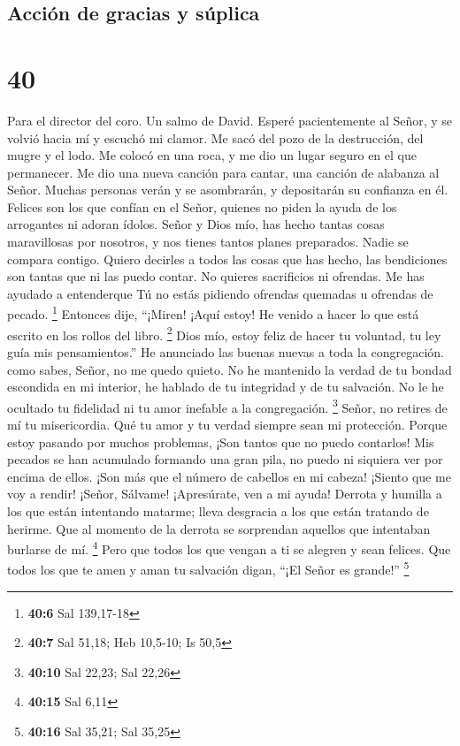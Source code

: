 \hypertarget{acciuxf3n-de-gracias-y-suxfaplica}{%
\subsection{Acción de gracias y
súplica}\label{acciuxf3n-de-gracias-y-suxfaplica}}

\hypertarget{section-39}{%
\section{40}\label{section-39}}

Para el director del coro. Un salmo de David.  Esperé
pacientemente al Señor, y se volvió hacia mí y escuchó mi clamor.
 Me sacó del pozo de la destrucción, del mugre y el lodo. Me
colocó en una roca, y me dio un lugar seguro en el que permanecer.
 Me dio una nueva canción para cantar, una canción de
alabanza al Señor. Muchas personas verán y se asombrarán, y depositarán
su confianza en él.  Felices son los que confían en el
Señor, quienes no piden la ayuda de los arrogantes ni adoran ídolos.
 Señor y Dios mío, has hecho tantas cosas maravillosas por
nosotros, y nos tienes tantos planes preparados. Nadie se compara
contigo. Quiero decirles a todos las cosas que has hecho, las
bendiciones son tantas que ni las puedo contar.  No quieres
sacrificios ni ofrendas. Me has ayudado a entenderque Tú no estás
pidiendo ofrendas quemadas u ofrendas de pecado. \footnote{\textbf{40:6}
  Sal 139,17-18}  Entonces dije, ``¡Miren! ¡Aquí estoy! He
venido a hacer lo que está escrito en los rollos del libro. \footnote{\textbf{40:7}
  Sal 51,18; Heb 10,5-10; Is 50,5}  Dios mío, estoy feliz de
hacer tu voluntad, tu ley guía mis pensamientos.''  He
anunciado las buenas nuevas a toda la congregación. como sabes, Señor,
no me quedo quieto.  No he mantenido la verdad de tu bondad
escondida en mi interior, he hablado de tu integridad y de tu salvación.
No le he ocultado tu fidelidad ni tu amor inefable a la congregación.
\footnote{\textbf{40:10} Sal 22,23; Sal 22,26}  Señor, no
retires de mí tu misericordia. Qué tu amor y tu verdad siempre sean mi
protección.  Porque estoy pasando por muchos problemas,
¡Son tantos que no puedo contarlos! Mis pecados se han acumulado
formando una gran pila, no puedo ni siquiera ver por encima de ellos.
¡Son más que el número de cabellos en mi cabeza! ¡Siento que me voy a
rendir!  ¡Señor, Sálvame! ¡Apresúrate, ven a mi ayuda!
 Derrota y humilla a los que están intentando matarme;
lleva desgracia a los que están tratando de herirme.  Que
al momento de la derrota se sorprendan aquellos que intentaban burlarse
de mí. \footnote{\textbf{40:15} Sal 6,11}  Pero que todos
los que vengan a ti se alegren y sean felices. Que todos los que te amen
y aman tu salvación digan, ``¡El Señor es grande!'' \footnote{\textbf{40:16}
  Sal 35,21; Sal 35,25}

